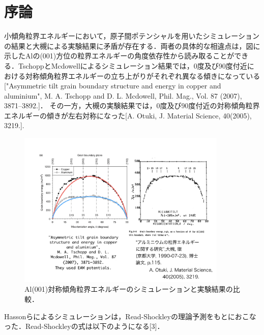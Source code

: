 
\section{序論}
小傾角粒界エネルギーにおいて，原子間ポテンシャルを用いたシミュレーションの結果と大槻による実験結果に矛盾が存在する．両者の具体的な相違点は，図に示したAlの(001)方位の粒界エネルギーの角度依存性から読み取ることができる．TschoppとMcdowellによるシミュレーション結果では，0度及び90度付近における対称傾角粒界エネルギーの立ち上がりがそれぞれ異なる傾きになっている["Asymmetric tilt grain boundary structure and energy in copper and aluminium", M. A. Tschopp and D. L. Mcdowell, Phil. Mag., Vol. 87 (2007), 3871–3892.]．
その一方，大槻の実験結果では，0度及び90度付近の対称傾角粒界エネルギーの傾きが左右対称になった[A. Otuki, J. Material Science, 40(2005), 3219.].

\begin{figure}[htbp]\begin{center}
\includegraphics[width=10cm,bb= 0 0 737 553]{../figs/./boundary_narita.002.jpeg}
\caption{Al(001)対称傾角粒界エネルギーのシミュレーションと実験結果の比較．}
\label{default}\end{center}\end{figure}
Hassonらによるシミュレーションは，Read-Shockleyの理論予測をもとにおこなった．Read-Shockleyの式は以下のようになる[3]．

